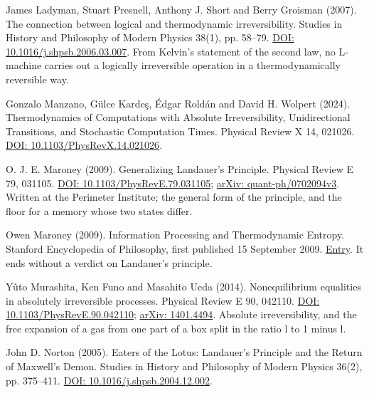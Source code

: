 \noindent James Ladyman, Stuart Presnell, Anthony J. Short and Berry Groisman (2007). The connection between logical and thermodynamic irreversibility. Studies in History and Philosophy of Modern Physics 38(1), pp. 58--79. \href{https://doi.org/10.1016/j.shpsb.2006.03.007}{DOI: 10.1016/j.shpsb.2006.03.007}. From Kelvin's statement of the second law, no L-machine carries out a logically irreversible operation in a thermodynamically reversible way.
\par\medskip

\noindent Gonzalo Manzano, G\"ulce Karde\c{s}, \'Edgar Rold\'an and David H. Wolpert (2024). Thermodynamics of Computations with Absolute Irreversibility, Unidirectional Transitions, and Stochastic Computation Times. Physical Review X 14, 021026. \href{https://doi.org/10.1103/PhysRevX.14.021026}{DOI: 10.1103/PhysRevX.14.021026}.
\par\medskip

\noindent O. J. E. Maroney (2009). Generalizing Landauer's Principle. Physical Review E 79, 031105. \href{https://doi.org/10.1103/PhysRevE.79.031105}{DOI: 10.1103/PhysRevE.79.031105}; \href{https://arxiv.org/abs/quant-ph/0702094v3}{arXiv: quant-ph/0702094v3}. Written at the Perimeter Institute; the general form of the principle, and the floor for a memory whose two states differ.
\par\medskip

\noindent Owen Maroney (2009). Information Processing and Thermodynamic Entropy. Stanford Encyclopedia of Philosophy, first published 15 September 2009. \href{https://plato.stanford.edu/entries/information-entropy/}{Entry}. It ends without a verdict on Landauer's principle.
\par\medskip

\noindent Y\^uto Murashita, Ken Funo and Masahito Ueda (2014). Nonequilibrium equalities in absolutely irreversible processes. Physical Review E 90, 042110. \href{https://doi.org/10.1103/PhysRevE.90.042110}{DOI: 10.1103/PhysRevE.90.042110}; \href{https://arxiv.org/abs/1401.4494}{arXiv: 1401.4494}. Absolute irreversibility, and the free expansion of a gas from one part of a box split in the ratio l to 1 minus l.
\par\medskip

\noindent John D. Norton (2005). Eaters of the Lotus: Landauer's Principle and the Return of Maxwell's Demon. Studies in History and Philosophy of Modern Physics 36(2), pp. 375--411. \href{https://doi.org/10.1016/j.shpsb.2004.12.002}{DOI: 10.1016/j.shpsb.2004.12.002}.
\par\medskip


